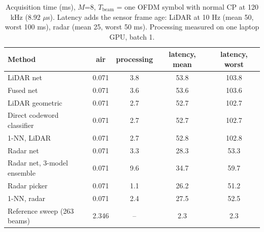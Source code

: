 \begin{table}[t]\centering\caption{Acquisition time (ms), $M$=8, $T_\mathrm{beam}$ = one OFDM symbol with normal CP at 120 kHz (8.92 $\mu$s). Latency adds the sensor frame age: LiDAR at 10 Hz (mean 50, worst 100 ms), radar (mean 25, worst 50 ms). Processing measured on one laptop GPU, batch 1.}\label{tab:acq_time}
\small\begin{tabular}{@{}lcccc@{}}\toprule
Method & air & processing & latency, mean & latency, worst \\\midrule
LiDAR net & 0.071 & 3.8 & 53.8 & 103.8 \\
Fused net & 0.071 & 3.6 & 53.6 & 103.6 \\
LiDAR geometric & 0.071 & 2.7 & 52.7 & 102.7 \\
Direct codeword classifier & 0.071 & 2.7 & 52.7 & 102.7 \\
1-NN, LiDAR & 0.071 & 2.7 & 52.8 & 102.8 \\
Radar net & 0.071 & 3.3 & 28.3 & 53.3 \\
Radar net, 3-model ensemble & 0.071 & 9.6 & 34.7 & 59.7 \\
Radar picker & 0.071 & 1.1 & 26.2 & 51.2 \\
1-NN, radar & 0.071 & 2.4 & 27.5 & 52.5 \\
Reference sweep (263 beams) & 2.346 & -- & 2.3 & 2.3 \\
\bottomrule\end{tabular}\end{table}
